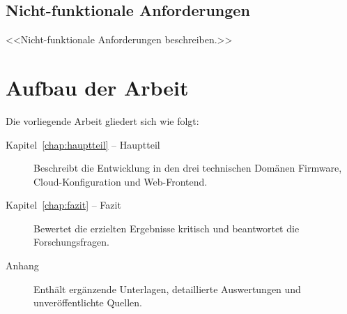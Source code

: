 \subsection{Nicht-funktionale Anforderungen}
<<Nicht-funktionale Anforderungen beschreiben.>>

\section{Aufbau der Arbeit}

Die vorliegende Arbeit gliedert sich wie folgt:
\begin{description}
  \item[Kapitel~\ref{chap:hauptteil} – Hauptteil]
    Beschreibt die Entwicklung in den drei technischen Domänen Firmware,
    Cloud-Konfiguration und Web-Frontend.
  \item[Kapitel~\ref{chap:fazit} – Fazit]
    Bewertet die erzielten Ergebnisse kritisch und beantwortet die
    Forschungsfragen.
  \item[Anhang]
    Enthält ergänzende Unterlagen, detaillierte Auswertungen und
    unveröffentlichte Quellen.
\end{description}
